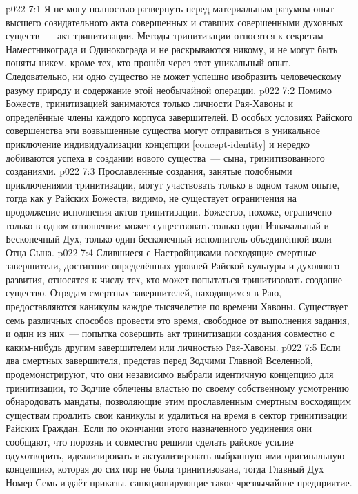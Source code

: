\vs p022 7:1 Я не могу полностью развернуть перед материальным разумом опыт высшего созидательного акта совершенных и ставших совершенными духовных существ~--- акт тринитизации. Методы тринитизации относятся к секретам Наместникограда и Одинокограда и не раскрываются никому, и не могут быть поняты никем, кроме тех, кто прошёл через этот уникальный опыт. Следовательно, ни одно существо не может успешно изобразить человеческому разуму природу и содержание этой необычайной операции.
\vs p022 7:2 Помимо Божеств, тринитизацией занимаются только личности Рая\hyp{}Хавоны и определённые члены каждого корпуса завершителей. В особых условиях Райского совершенства эти возвышенные существа могут отправиться в уникальное приключение индивидуализации концепции [concept\hyp{}identity] и нередко добиваются успеха в создании нового существа~--- сына, тринитизованного созданиями.
\vs p022 7:3 Прославленные создания, занятые подобными приключениями тринитизации, могут участвовать только в одном таком опыте, тогда как у Райских Божеств, видимо, не существует ограничения на продолжение исполнения актов тринитизации. Божество, похоже, ограничено только в одном отношении: может существовать только один Изначальный и Бесконечный Дух, только один бесконечный исполнитель объединённой воли Отца\hyp{}Сына.
\vs p022 7:4 Слившиеся с Настройщиками восходящие смертные завершители, достигшие определённых уровней Райской культуры и духовного развития, относятся к числу тех, кто может попытаться тринитизовать создание\hyp{}существо. Отрядам смертных завершителей, находящимся в Раю, предоставляются каникулы каждое тысячелетие по времени Хавоны. Существует семь различных способов провести это время, свободное от выполнения задания, и один из них~--- попытка совершить акт тринитизации создания совместно с каким\hyp{}нибудь другим завершителем или личностью Рая\hyp{}Хавоны.
\vs p022 7:5 Если два смертных завершителя, представ перед Зодчими Главной Вселенной, продемонстрируют, что они независимо выбрали идентичную концепцию для тринитизации, то Зодчие облечены властью по своему собственному усмотрению обнародовать мандаты, позволяющие этим прославленным смертным восходящим существам продлить свои каникулы и удалиться на время в сектор тринитизации Райских Граждан. Если по окончании этого назначенного уединения они сообщают, что порознь и совместно решили сделать райское усилие одухотворить, идеализировать и актуализировать выбранную ими оригинальную концепцию, которая до сих пор не была тринитизована, тогда Главный Дух Номер Семь издаёт приказы, санкционирующие такое чрезвычайное предприятие.
